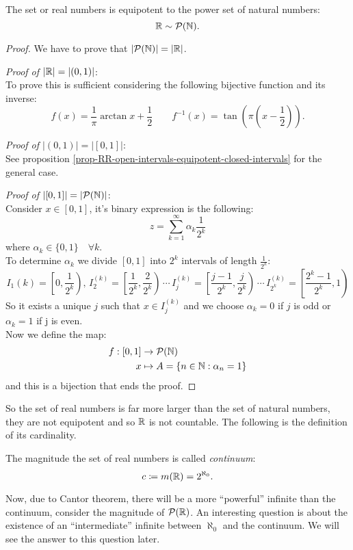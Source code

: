 \begin{prop}\label{RR-equipotent-power-set-NN}
	The set or real numbers is equipotent to the power set of natural numbers:
	$$\mathbb R \sim \mathcal P(\mathbb N).$$
\end{prop}
\begin{proof}
	We have to prove that $|\mathcal P(\mathbb N)| = |\mathbb R|$.
	
	\textit{Proof of $|\mathbb R|=|(0,1)|$}:\\
	To prove this is sufficient considering the following bijective function and its inverse:
	$$f(x) = \frac 1 \pi \arctan x + \frac 1 2 \qquad f^{-1}(x) = \tan(\pi(x-\frac 1 2)).$$
	
	\textit{Proof of $|(0,1)| = |[0,1]|$}:\\
	See proposition \vref{prop-RR-open-intervals-equipotent-closed-intervals} for the general case.
	
	\textit{Proof of $|[0,1]|=|\mathcal P(\mathbb N)|$}:\\
	Consider $x\in [0,1]$, it's binary expression is the following:
	$$z= \sum_{k=1}^{\infty} \alpha_k \frac1{2^k}$$
	where  $\alpha_k \in \{0,1\} \quad \forall k$.\\
	To determine $\alpha_k$ we divide $[0,1]$ into $2^k$ intervals of length $\frac 1 {2^k}$:
	$$I_1{(k)}=\left[0, \frac 1 {2^k}\right), \, 
	I_2^{(k)}=\left[\frac 1 {2^k}, \frac 2 {2^k}\right) \,
	\cdots \,
	I_j^{(k)} = \left[\frac {j-1} {2^k}, \frac j {2^k}\right)  \,
	\cdots \,
	I_{2^k}^{(k)} = \left[\frac {2^k -1} {2^k}, 1\right)$$
	So it exists a unique $j$ such that $x\in I_j^{(k)}$ and we choose $\alpha_k = 0$ if $j$ is odd or $\alpha_k = 1$ if j is even.\\
	Now we define the map:
	\begin{align*}
	f:[0,1] & \to \mathcal P(\mathbb N)\\
	x & \mapsto A = \{n \in \mathbb N: \alpha_n = 1\}
	\end{align*}
	and this is a bijection that ends the proof.
\end{proof}

So the set of real numbers is far more larger than the set of natural numbers, they are not equipotent and so $\mathbb R$ is not countable. The following is the definition of its cardinality.
\begin{defn}
	The magnitude the set of real numbers is called \emph{continuum}:
	$$c \coloneqq m(\mathbb R) = 2 ^ {\aleph_0}.$$
\end{defn}

Now, due to Cantor theorem, there will be a more ``powerful'' infinite than the continuum, consider the magnitude of $\mathcal P(\mathbb R)$. An interesting question is about the existence of an ``intermediate'' infinite between $\aleph_0$ and the continuum. We will see the answer to this question later.


